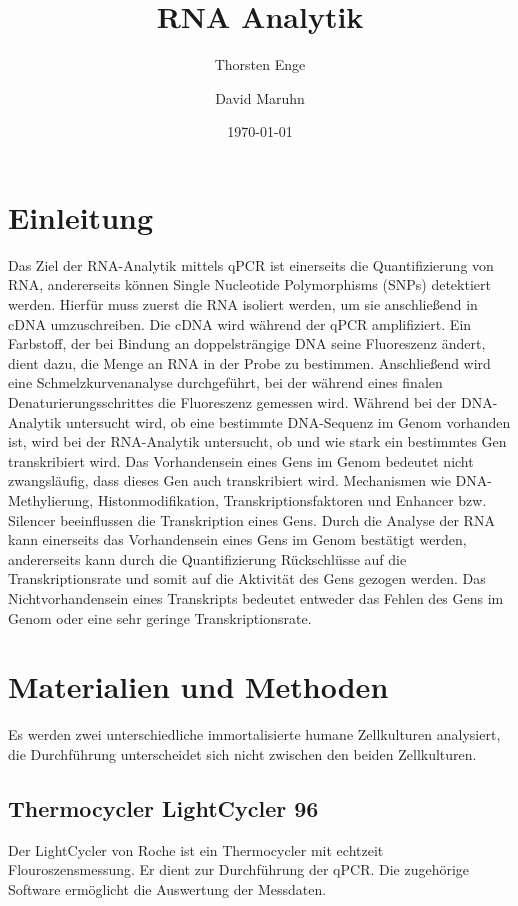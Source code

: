 \documentclass{article}
\title{RNA Analytik}
\author{Thorsten Enge \and David Maruhn}
\date{\today}
\begin{document}
\maketitle

\tableofcontents
\newpage

\section{Einleitung}

Das Ziel der RNA-Analytik mittels qPCR ist einerseits die Quantifizierung von RNA, andererseits können Single Nucleotide Polymorphisms (SNPs) detektiert werden. Hierfür muss zuerst die RNA isoliert werden, um sie anschließend in cDNA umzuschreiben. Die cDNA wird während der qPCR amplifiziert. Ein Farbstoff, der bei Bindung an doppelsträngige DNA seine Fluoreszenz ändert, dient dazu, die Menge an RNA in der Probe zu bestimmen. Anschließend wird eine Schmelzkurvenanalyse durchgeführt, bei der während eines finalen Denaturierungsschrittes die Fluoreszenz gemessen wird. Während bei der DNA-Analytik untersucht wird, ob eine bestimmte DNA-Sequenz im Genom vorhanden ist, wird bei der RNA-Analytik untersucht, ob und wie stark ein bestimmtes Gen transkribiert wird. Das Vorhandensein eines Gens im Genom bedeutet nicht zwangsläufig, dass dieses Gen auch transkribiert wird. Mechanismen wie DNA-Methylierung, Histonmodifikation, Transkriptionsfaktoren und Enhancer bzw. Silencer beeinflussen die Transkription eines Gens. Durch die Analyse der RNA kann einerseits das Vorhandensein eines Gens im Genom bestätigt werden, andererseits kann durch die Quantifizierung Rückschlüsse auf die Transkriptionsrate und somit auf die Aktivität des Gens gezogen werden. Das Nichtvorhandensein eines Transkripts bedeutet entweder das Fehlen des Gens im Genom oder eine sehr geringe Transkriptionsrate.

\section{Materialien und Methoden}

Es werden zwei unterschiedliche immortalisierte humane Zellkulturen analysiert, die Durchführung unterscheidet sich nicht zwischen den beiden Zellkulturen.

\subsection*{Thermocycler LightCycler 96}
Der LightCycler von Roche ist ein Thermocycler mit echtzeit Flouroszensmessung. Er dient zur Durchführung der qPCR. Die zugehörige Software ermöglicht die Auswertung der Messdaten.
\end{document}
